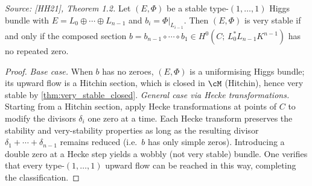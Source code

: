 \begin{theorem}
  \label{thm:type_one_one_classification}
  \textit{Source: [HH21], Theorem 1.2.}
  Let \((E, \Phi)\) be a stable type-\((1,\ldots,1)\) Higgs bundle with
  \(E = L_0 \oplus \cdots \oplus L_{n-1}\) and \(b_i = \Phi|_{L_{i-1}}\).  Then \((E, \Phi)\)
  is very stable if and only if the composed section
  \(b = b_{n-1} \circ \cdots \circ b_1 \in H^0(C;\, L_0^* L_{n-1} K^{n-1})\)
  has no repeated zero.
\end{theorem}

\begin{proof}
  \textit{Base case.}  When \(b\) has no zeroes, \((E, \Phi)\) is a uniformising Higgs bundle;
  its upward flow is a Hitchin section, which is closed in \(\cM\) (Hitchin), hence very stable
  by \cref{thm:very_stable_closed}.
  \textit{General case via Hecke transformations.}  Starting from a Hitchin section, apply Hecke
  transformations at points of \(C\) to modify the divisors \(\delta_i\) one zero at a time.
  Each Hecke transform preserves the stability and very-stability properties as long as the
  resulting divisor \(\delta_1 + \cdots + \delta_{n-1}\) remains reduced (i.e.\ \(b\) has only
  simple zeros).  Introducing a double zero at a Hecke step yields a wobbly (not very stable)
  bundle.  One verifies that every type-\((1,\ldots,1)\) upward flow can be reached in this way,
  completing the classification.
\end{proof}

